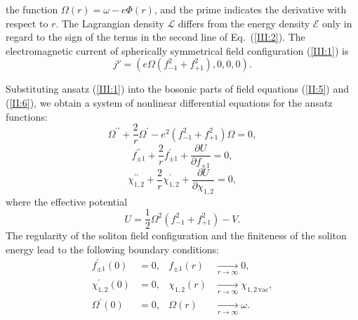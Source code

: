 the  function  $\Omega \left( r \right) = \omega - e\Phi \left( r \right)$, and
the prime indicates the derivative with respect to $r$.
The Lagrangian   density   $\mathcal{L}$   differs   from   the  energy density
$\mathcal{E}$ only  in  regard  to  the sign of the terms in the second line of
Eq.~(\ref{III:2}).
The electromagnetic  current  of  spherically  symmetrical  field configuration
(\ref{III:1}) is
\begin{equation}
j^{\nu}=\left(e \Omega \left(f_{-1}^{2}+f_{+1}^{2}\right), 0, 0, 0\right).
                                                                  \label{III:4}
\end{equation}


Substituting ansatz (\ref{III:1}) into  the  bosonic  parts  of field equations
(\ref{II:5})  and (\ref{II:6}),  we  obtain  a system of nonlinear differential
equations for the ansatz functions:
\begin{equation}
\Omega ^{\prime \prime }+\frac{2}{r}\Omega ^{\prime }-e^{2}\left(
f_{-1}^{2}+f_{+1}^{2}\right) \Omega =0,                           \label{III:5}
\end{equation}
\begin{equation}
f_{\pm 1}^{\prime \prime }+\frac{2}{r}f_{\pm 1}^{\prime }+\frac{\partial U}
{\partial f_{\pm 1}}=0,                                           \label{III:6}
\end{equation}
\begin{equation}
\chi_{1,2}^{\prime \prime}+\frac{2}{r}\chi_{1,2}^{\prime}+\frac{\partial U}
{\partial \chi _{1,2}}=0,                                         \label{III:7}
\end{equation}
where the effective potential
\begin{equation}
U=\frac{1}{2}\Omega^{2}\left(f_{-1}^{2}+f_{+1}^{2}\right)-V.      \label{III:8}
\end{equation}
The regularity of the soliton  field  configuration  and  the finiteness of the
soliton energy lead to the following boundary conditions:
\begin{subequations}                                              \label{III:9}
\begin{align}
f_{\pm 1}^{\prime }\left( 0\right) &=0, & f_{\pm 1}\left( r\right) & \underset
{r\rightarrow \infty }{\longrightarrow }0,                       \label{III:9a}
 \\
\chi _{1,2}^{\prime }\left( 0\right) &=0, & \chi _{1,2}\left( r\right)
& \underset{r\rightarrow \infty }{\longrightarrow }\chi_{1,2\,\text{vac}},
                                                                 \label{III:9b}
 \\
\Omega ^{\prime }\left( 0\right) &=0, & \Omega \left( r\right) & \underset{
r\rightarrow \infty}{\longrightarrow} \omega.                    \label{III:9c}
\end{align}
\end{subequations}


